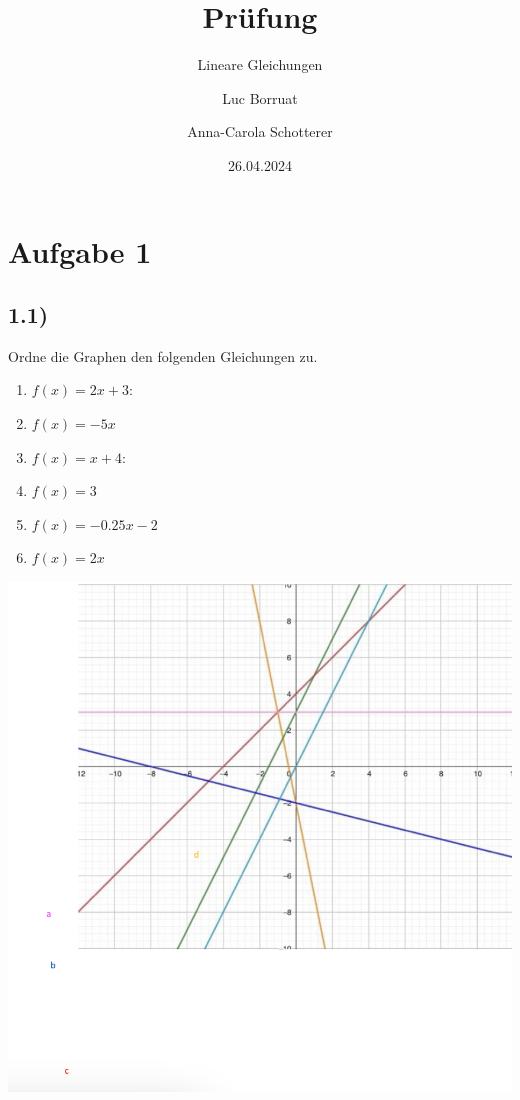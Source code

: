 \documentclass[
  letterpaper,
  DIV=11]{scrartcl}
\title{Prüfung}
\subtitle{Lineare Gleichungen}
\author{Luc Borruat \and Anna-Carola Schotterer}
\date{26.04.2024}
\providecommand{\tightlist}{%
  \setlength{\itemsep}{0pt}\setlength{\parskip}{0pt}}\usepackage{longtable,booktabs,array}
\begin{document}
\maketitle

\section{Aufgabe 1}\label{aufgabe-1}

\subsection{1.1)}\label{section}

Ordne die Graphen den folgenden Gleichungen zu.

\begin{enumerate}
\def\labelenumi{\arabic{enumi}.}
\tightlist
\item
  \(f(x) = 2x+ 3:\)
\item
  \(f(x) = −5x\)\\
\item
  \(f(x)=x+4:\)
\item
  \(f(x)=3\)
\item
  \(f(x)=-0.25x-2\)
\item
  \(f(x)=2x\)
\end{enumerate}

\includegraphics{images/Screenshot 2024-06-13 at 13.25.17.png}
\end{document}
